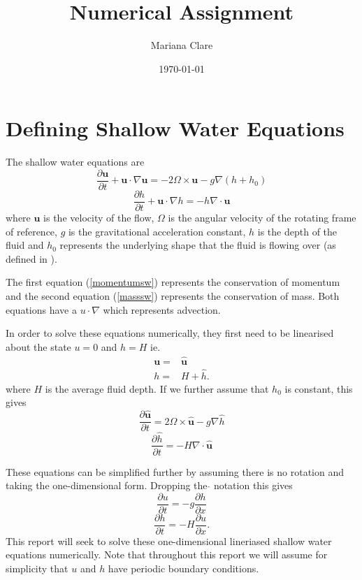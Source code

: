 \documentclass[a4paper,12pt, notitlepage]{article}
\title{Numerical Assignment}
\author{Mariana Clare}
\date{\today}
\begin{document}
	
\maketitle
\thispagestyle{empty}
\section{Defining Shallow Water Equations}
The shallow water equations are
\begin{equation}\label{momentumsw}
\frac{\partial \mathbf{u}}{\partial t} + \mathbf{u}\cdot\nabla\mathbf{u} = - 2\Omega \times\mathbf{u} - g\nabla (h + h_{0})
\end{equation}
\begin{equation}\label{masssw}
\frac{\partial h}{\partial t} + \mathbf{u}\cdot\nabla h = - h \nabla \cdot \mathbf{u}
\end{equation}
where $\mathbf{u}$ is the velocity of the flow, $\Omega$ is the angular velocity of the rotating frame of reference, $g$ is the gravitational acceleration constant, $h$ is the depth of the fluid and $h_{0}$ represents the underlying shape that the fluid is flowing over (as defined in \cite{MPE textbook}).

The first equation (\ref{momentumsw}) represents the conservation of momentum and the second equation (\ref{masssw}) represents the conservation of mass. Both equations have a $u\cdot\nabla$ which represents advection.

In order to solve these equations numerically, they first need to be linearised about the state $u = 0$ and $h = H$ ie.
\begin{eqnarray}\nonumber
\mathbf{u} =  & \mathbf{\hat{u}}
 \\   \nonumber
h = &  H + \hat{h} .
\end{eqnarray}
where $H$ is the average fluid depth. If we further assume that $h_{0}$ is constant, this gives
\begin{equation}
\frac{\partial \mathbf{\hat{u}}}{\partial t} = 2 \Omega \times \mathbf{\hat{u}} - g \nabla \hat{h}
\end{equation}
\begin{equation}
\frac{\partial \hat{h}}{\partial t} = - H \nabla \cdot \mathbf{\hat{u}}
\end{equation}

These equations can be simplified further by assuming there is no rotation and taking the one-dimensional form. Dropping the $\hat{}$ notation this gives
\begin{equation}\label{linearisedsw1}
\frac{\partial u}{\partial t} = - g \frac{\partial h}{\partial x}
\end{equation}
\begin{equation}\label{linearisedsw2}
\frac{\partial h}{\partial t} = - H \frac{\partial u}{\partial x}.
\end{equation}
This report will seek to solve these one-dimensional lineriased shallow water equations numerically. Note that throughout this report we will assume for simplicity that $u$ and $h$ have periodic boundary conditions.
\end{document}
